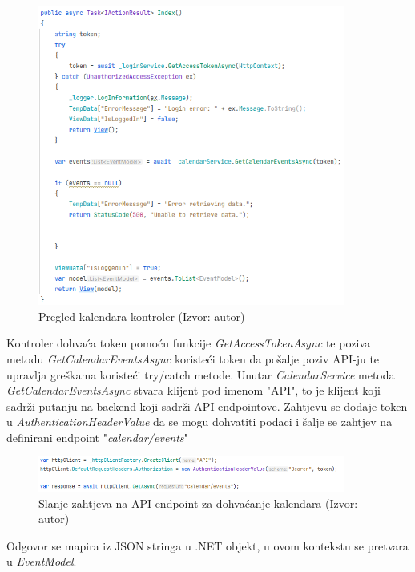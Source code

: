 \documentclass{foi}
\begin{document}
\begin{figure}[H]
    \centering
    \includegraphics[width=0.9\textwidth]{slike/cControllerIndex.png}
    \caption{Pregled kalendara kontroler (Izvor: autor)}
    \label{fig:ctrl}

\end{figure}
Kontroler dohvaća token pomoću funkcije \textit{GetAccessTokenAsync} te poziva metodu \textit{GetCalendarEventsAsync} koristeći token da pošalje poziv API-ju te upravlja greškama koristeći try/catch metode. 
Unutar \textit{CalendarService} metoda \textit{GetCalendarEventsAsync} stvara klijent pod imenom "API", to je klijent koji sadrži putanju na backend koji sadrži API endpointove.
Zahtjevu se dodaje token u \textit{AuthenticationHeaderValue} da se mogu dohvatiti podaci i šalje se zahtjev na definirani endpoint "\textit{calendar/events}"
\begin{figure}[H]
    \centering
    \includegraphics[width=0.9\textwidth]{slike/calendarRequest.png}
    \caption{Slanje zahtjeva na API endpoint za dohvaćanje kalendara (Izvor: autor)}
    \label{fig:calendarRequest}

\end{figure}
Odgovor se mapira iz JSON stringa u .NET objekt, u ovom kontekstu se pretvara u \textit{EventModel}.
\end{document}
